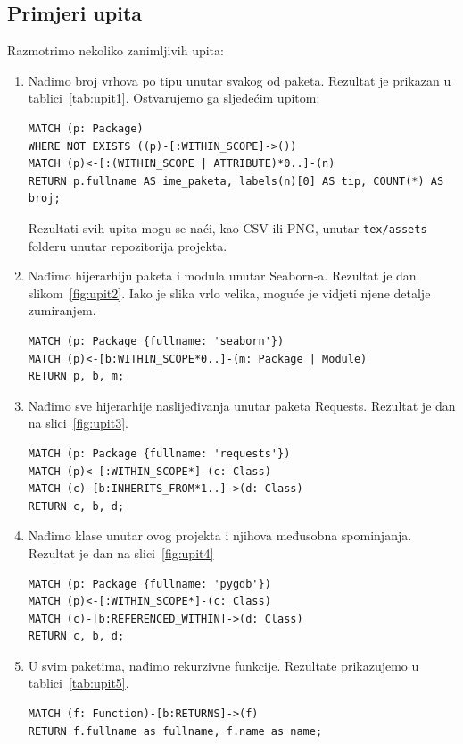 \subsection{Primjeri upita} \label{subsec:primjer}
Razmotrimo nekoliko zanimljivih upita:
\begin{enumerate}

\item Nađimo broj vrhova po tipu unutar svakog od paketa. Rezultat je prikazan
u tablici~\ref{tab:upit1}. Ostvarujemo ga sljedećim upitom:
\begin{lstlisting}
MATCH (p: Package)
WHERE NOT EXISTS ((p)-[:WITHIN_SCOPE]->())
MATCH (p)<-[:(WITHIN_SCOPE | ATTRIBUTE)*0..]-(n)
RETURN p.fullname AS ime_paketa, labels(n)[0] AS tip, COUNT(*) AS broj;
\end{lstlisting}
Rezultati svih upita mogu se naći, kao CSV ili PNG, unutar \texttt{tex/assets}
folderu unutar repozitorija projekta.

\item Nađimo hijerarhiju paketa i modula unutar Seaborn-a. Rezultat je
dan slikom~\ref{fig:upit2}. Iako je slika vrlo velika,
moguće je vidjeti njene detalje zumiranjem.
\begin{lstlisting}
MATCH (p: Package {fullname: 'seaborn'})
MATCH (p)<-[b:WITHIN_SCOPE*0..]-(m: Package | Module)
RETURN p, b, m;
\end{lstlisting}

\item Nađimo sve hijerarhije naslijeđivanja unutar paketa Requests. Rezultat je dan
na slici~\ref{fig:upit3}.
\begin{lstlisting}
MATCH (p: Package {fullname: 'requests'})
MATCH (p)<-[:WITHIN_SCOPE*]-(c: Class)
MATCH (c)-[b:INHERITS_FROM*1..]->(d: Class)
RETURN c, b, d;
\end{lstlisting}

\item Nađimo klase unutar ovog projekta i njihova međusobna spominjanja. Rezultat
je dan na slici~\ref{fig:upit4}
\begin{lstlisting}
MATCH (p: Package {fullname: 'pygdb'})
MATCH (p)<-[:WITHIN_SCOPE*]-(c: Class)
MATCH (c)-[b:REFERENCED_WITHIN]->(d: Class)
RETURN c, b, d;
\end{lstlisting}

\item U svim paketima, nađimo rekurzivne funkcije. Rezultate prikazujemo u
tablici~\ref{tab:upit5}.

\begin{lstlisting}
MATCH (f: Function)-[b:RETURNS]->(f)
RETURN f.fullname as fullname, f.name as name;
\end{lstlisting}


\end{enumerate}
